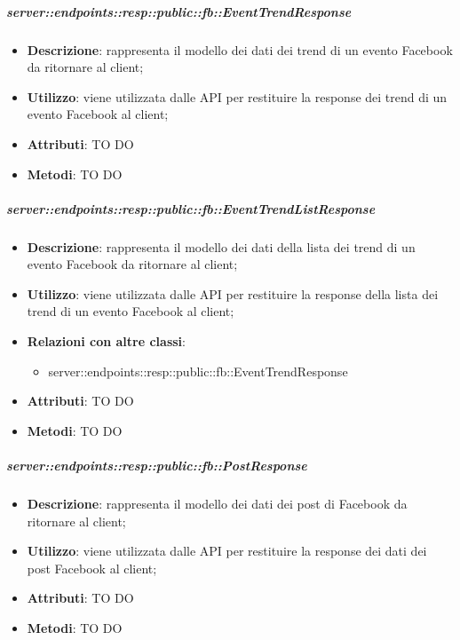     \subparagraph{server::endpoints::resp::public::fb::EventTrendResponse} %
    \label{subp:bdsm_app_server_endpoints_resp_public_fb_eventtrendresponse}
    \begin{itemize}
      \item \textbf{Descrizione}: rappresenta il modello dei dati dei trend di un evento Facebook da ritornare al client;
      \item \textbf{Utilizzo}: viene utilizzata dalle API per restituire la response dei trend di un evento Facebook al client;
      
	  \item \textbf{Attributi}: TO DO
	  \item \textbf{Metodi}: TO DO
      \end{itemize}

    \subparagraph{server::endpoints::resp::public::fb::EventTrendListResponse} %
    \label{subp:bdsm_app_server_endpoints_resp_public_fb_eventtrendlistresponse}
    \begin{itemize}
      \item \textbf{Descrizione}: rappresenta il modello dei dati della lista dei trend di un evento Facebook da ritornare al client;
      \item \textbf{Utilizzo}: viene utilizzata dalle API per restituire la response della lista dei trend di un evento Facebook al client;
      \item \textbf{Relazioni con altre classi}:
        \begin{itemize}
          \item server::endpoints::resp::public::fb::EventTrendResponse
        \end{itemize}
	  \item \textbf{Attributi}: TO DO
	  \item \textbf{Metodi}: TO DO
      \end{itemize}

    \subparagraph{server::endpoints::resp::public::fb::PostResponse} %
    \label{subp:bdsm_app_server_endpoints_resp_public_fb_postresponse}
    \begin{itemize}
      \item \textbf{Descrizione}: rappresenta il modello dei dati dei post di Facebook da ritornare al client;
      \item \textbf{Utilizzo}: viene utilizzata dalle API per restituire la response dei dati dei post Facebook al client;
      
	  \item \textbf{Attributi}: TO DO
	  \item \textbf{Metodi}: TO DO
    \end{itemize}

